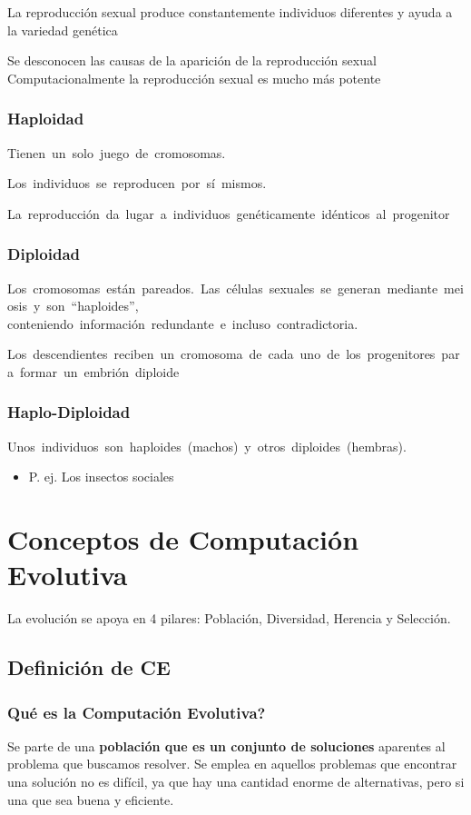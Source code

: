 \documentclass[12pt, twoside, openright]{report} %
\begin{document}
La reproducción sexual produce constantemente individuos diferentes y ayuda a la variedad genética

Se desconocen las causas de la aparición de la reproducción sexual Computacionalmente la reproducción sexual es mucho más potente

\subsubsection{Haploidad}
Tienen un solo juego de cromosomas.

Los individuos se reproducen por sí mismos.

La reproducción da lugar a individuos genéticamente idénticos al progenitor

\subsubsection{Diploidad}
Los cromosomas están pareados. Las células sexuales se generan mediante meiosis y son “haploides”, conteniendo información redundante e incluso contradictoria.

Los descendientes reciben un cromosoma de cada uno de los progenitores para formar un embrión diploide

\subsubsection{Haplo-Diploidad}
Unos individuos son haploides (machos) y otros diploides (hembras).
\begin{itemize}
	\item P. ej. Los insectos sociales
\end{itemize}
\pagebreak

\section{Conceptos de Computación Evolutiva}
La evolución se apoya en 4 pilares: Población, Diversidad, Herencia y Selección.
\subsection{Definición de CE}
\subsubsection{Qué es la Computación Evolutiva?}
Se parte de una \textbf{población que es un conjunto de soluciones} aparentes al problema que buscamos resolver. Se emplea en aquellos problemas que encontrar una solución no es difícil, ya que hay una cantidad enorme de alternativas, pero si una que sea buena y eficiente.
\end{document}

